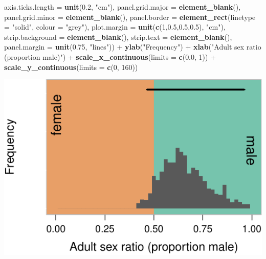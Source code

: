 \documentclass[]{article}
\newenvironment{Shaded}{\begin{snugshade}}{\end{snugshade}}
\newcommand{\KeywordTok}[1]{\textcolor[rgb]{0.13,0.29,0.53}{\textbf{{#1}}}}
\newcommand{\DataTypeTok}[1]{\textcolor[rgb]{0.13,0.29,0.53}{{#1}}}
\newcommand{\DecValTok}[1]{\textcolor[rgb]{0.00,0.00,0.81}{{#1}}}
\newcommand{\FloatTok}[1]{\textcolor[rgb]{0.00,0.00,0.81}{{#1}}}
\newcommand{\StringTok}[1]{\textcolor[rgb]{0.31,0.60,0.02}{{#1}}}
\newcommand{\NormalTok}[1]{{#1}}
\begin{document}
\begin{Shaded}
\begin{Highlighting}[]
        \DataTypeTok{axis.ticks.length =} \KeywordTok{unit}\NormalTok{(}\FloatTok{0.2}\NormalTok{, }\StringTok{"cm"}\NormalTok{),}
        \DataTypeTok{panel.grid.major =} \KeywordTok{element_blank}\NormalTok{(),}
        \DataTypeTok{panel.grid.minor =} \KeywordTok{element_blank}\NormalTok{(),}
        \DataTypeTok{panel.border =} \KeywordTok{element_rect}\NormalTok{(}\DataTypeTok{linetype =} \StringTok{"solid"}\NormalTok{, }\DataTypeTok{colour =} \StringTok{"grey"}\NormalTok{),}
        \DataTypeTok{plot.margin =} \KeywordTok{unit}\NormalTok{(}\KeywordTok{c}\NormalTok{(}\DecValTok{1}\NormalTok{,}\FloatTok{0.5}\NormalTok{,}\FloatTok{0.5}\NormalTok{,}\FloatTok{0.5}\NormalTok{), }\StringTok{"cm"}\NormalTok{),}
        \DataTypeTok{strip.background =} \KeywordTok{element_blank}\NormalTok{(), }
        \DataTypeTok{strip.text =} \KeywordTok{element_blank}\NormalTok{(),}
        \DataTypeTok{panel.margin =} \KeywordTok{unit}\NormalTok{(}\FloatTok{0.75}\NormalTok{, }\StringTok{"lines"}\NormalTok{)) +}
\StringTok{  }\KeywordTok{ylab}\NormalTok{(}\StringTok{"Frequency"}\NormalTok{) +}
\StringTok{  }\KeywordTok{xlab}\NormalTok{(}\StringTok{"Adult sex ratio (proportion male)"}\NormalTok{) +}
\StringTok{  }\KeywordTok{scale_x_continuous}\NormalTok{(}\DataTypeTok{limits =} \KeywordTok{c}\NormalTok{(}\FloatTok{0.0}\NormalTok{, }\DecValTok{1}\NormalTok{)) +}
\StringTok{  }\KeywordTok{scale_y_continuous}\NormalTok{(}\DataTypeTok{limits =} \KeywordTok{c}\NormalTok{(}\DecValTok{0}\NormalTok{, }\DecValTok{160}\NormalTok{))}
\end{Highlighting}
\end{Shaded}

\begin{center}\includegraphics{Ceuta_ASR_Matrix_Modeling_files/figure-latex/unnamed-chunk-30-1} \end{center}
\end{document}
